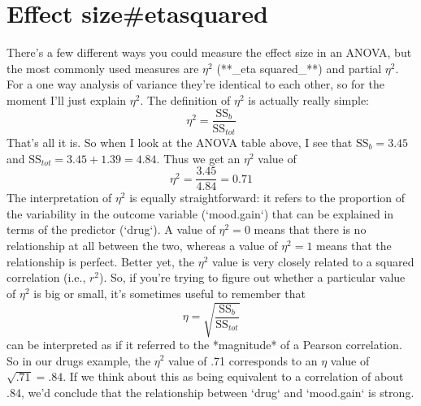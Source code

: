 \section{Effect size{#etasquared}}


There's a few different ways you could measure the effect size in an ANOVA, but the most commonly used measures are $\eta^2$ (**_eta squared_**) and partial $\eta^2$. For a one way analysis of variance they're identical to each other, so for the moment I'll just explain $\eta^2$. The definition of $\eta^2$ is actually really simple:
$$
\eta^2 = \frac{\mbox{SS}_b}{\mbox{SS}_{tot}}
$$
That's all it is. So when I look at the ANOVA table above, I see that $\mbox{SS}_b = 3.45$  and $\mbox{SS}_{tot} = 3.45 + 1.39 = 4.84$. Thus we get an $\eta^2$ value of 
$$
\eta^2 = \frac{3.45}{4.84} = 0.71
$$
The interpretation of $\eta^2$ is equally straightforward: it refers to the proportion of the variability in the outcome variable (`mood.gain`) that can be explained in terms of the predictor (`drug`). A value of $\eta^2 = 0$ means that there is no relationship at all between the two, whereas a value of $\eta^2 = 1$ means that the relationship is perfect. Better yet, the $\eta^2$ value is very closely related to a squared correlation (i.e., $r^2$). So, if you're trying to figure out whether a particular value of $\eta^2$ is big or small, it's sometimes useful to remember that 
$$
\eta= \sqrt{\frac{\mbox{SS}_b}{\mbox{SS}_{tot}}}
$$
can be interpreted as if it referred to the *magnitude* of a Pearson correlation. So in our drugs example, the $\eta^2$ value of .71 corresponds to an $\eta$ value of $\sqrt{.71} = .84$. If we think about this as being equivalent to a correlation of about .84, we'd conclude that the relationship between `drug` and `mood.gain` is strong. 

